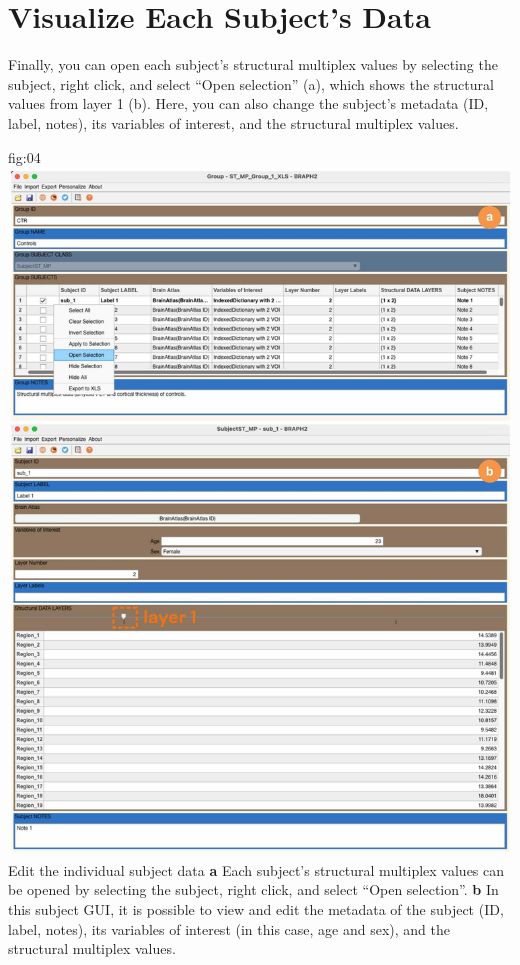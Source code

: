 \documentclass[justified]{tufte-handout}
\begin{document}

\section{Visualize Each Subject's Data}

Finally, you can open each subject's structural multiplex values by selecting the subject, right click, and select ``Open selection'' (a), which shows the structural values from layer 1 (b). Here, you can also change the subject's metadata (ID, label, notes), its variables of interest, and the structural multiplex values.

	{fig:04}
	{\includegraphics{fig04.jpg}
	}
	{Edit the individual subject data}
	{
	{\bf a}  Each subject's structural multiplex values can be opened by selecting the subject, right click, and select ``Open selection''.
	{\bf b} In this subject GUI, it is possible to view and edit the metadata of the subject (ID, label, notes), its variables of interest (in this case, age and sex), and the structural multiplex values. 
	}
\end{document}

